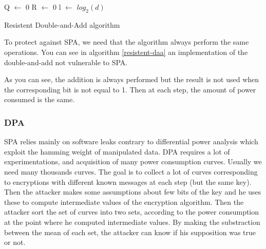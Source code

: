 \documentclass[journal]{IEEEtran}
\begin{document}
\begin{algorithm}
    \SetAlgoLined %
   
    \SetSideCommentLeft 
    \SetNoFillComment

    
    
    Q $\leftarrow$ 0\;
    R $\leftarrow$ 0\;
    l $\leftarrow$ $log_2(d)$\;

    \bigskip

    \caption{Resistent Double-and-Add algorithm}
    \label{resistent-daa}
\end{algorithm}

To protect against SPA, we need that the algorithm always perform the same operations. You can see in algorithm \ref{resistent-daa} an implementation of the double-and-add not vulnerable to SPA.


As you can see, the addition is always performed but the result is not used when the corresponding bit is not equal to 1. Then at each step, the amount of power consumed is the same.\\

        \subsubsection{DPA}

SPA relies mainly on software leaks contrary to differential power analysis which exploit the hamming weight of manipulated data. DPA requires a lot of experimentations, and acquisition of many power consumption curves. Usually we need many thousands curves. The goal is to collect a lot of curves corresponding to encryptions with different known messages at each step (but the same key). Then the attacker makes some assumptions about few bits of the key and he uses these to compute intermediate values of the encryption algorithm. Then the attacker sort the set of curves into two sets, according to the power consumption at the point where he computed intermediate values. By making the substraction between the mean of each set, the attacker can know if his supposition was true or not. \\
\end{document}
